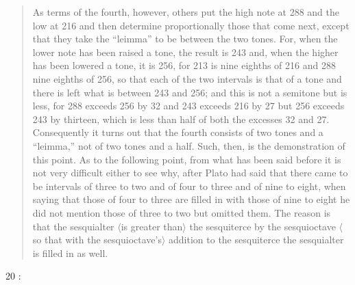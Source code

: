 \documentclass{article}
\theoremstyle{definition}
\begin{document}
\begin{quote}
As terms of the fourth, however, others put the high note at 288 and the low at 216 and then determine proportionally those that come next, except that they take the ``leimma'' to be
 between the two tones. For, when the lower note has been raised a tone, the result is 243 and, when the higher has been lowered a tone, it is 256, for 213 is nine eighths of 216 and
 288 nine eighths of 256, so that each of the two intervals is that of a tone and there is left what is between 243 and 256; and this is not a semitone but
is less, for 288 exceeds 256 by 32 and 243 exceeds 216 by 27 but 256 exceeds 243 by thirteen, which is less than half of both the excesses 32 and 27. Consequently it turns out
that the fourth consists of two tones and a ``leimma,'' not of two tones and a half. Such, then, is the demonstration of this point. As to the following point, from what has been said
before it is not very difficult either to see why, after Plato had said that there came to be intervals of three to two and of four to three and of nine to eight, when saying that those of four
to three are filled in with those of nine to eight he did not mention those of three to two but omitted them. The reason is that the sesquialter {$\langle$}is greater than{$\rangle$} the 
sesquiterce by the sesquioctave {$\langle$}so that with the sesquioctave's{$\rangle$} addition to the sesquiterce the sesquialter is filled in as well.
\end{quote}

20 \cite[pp.~317--321]{chernissI}:
\end{document}
